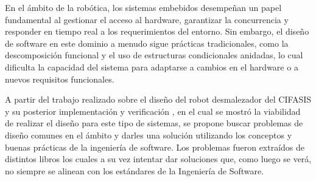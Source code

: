 %
%

En el ámbito de la robótica, los sistemas embebidos desempeñan un papel fundamental al gestionar el acceso al hardware, garantizar la concurrencia y responder en tiempo real a los requerimientos del entorno. Sin embargo, el diseño de software en este dominio a menudo sigue prácticas tradicionales, como la descomposición funcional y el uso de estructuras condicionales anidadas, lo cual dificulta la capacidad del sistema para adaptarse a cambios en el hardware o a nuevos requisitos funcionales.

A partir del trabajo realizado sobre el diseño del robot desmalezador del CIFASIS y su posterior implementación y verificación \cite{paperPomponio}, en el cual se mostró la viabilidad de realizar el diseño para este tipo de sistemas, se propone buscar problemas de diseño comunes en el ámbito y darles una solución utilizando los conceptos y buenas prácticas de la ingeniería de software. Los problemas fueron extraídos de distintos libros \cite{douglass}\cite{elecia} los cuales a su vez intentar dar soluciones que, como luego se verá, no siempre se alinean con los estándares de la Ingeniería de Software.
